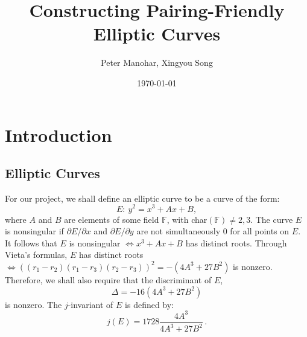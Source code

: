 \documentclass[12pt,twoside]{article}
\title{Constructing Pairing-Friendly Elliptic Curves }
\date{\today}
\author{ Peter Manohar, Xingyou Song}
\begin{document}
\maketitle


\tableofcontents

\section{Introduction}



\subsection{Elliptic Curves}

For our project, we shall define an elliptic curve to be a curve of the form:
\begin{equation}
E: \ y^2 = x^3 + Ax + B,
\end{equation}
where $A$ and $B$ are elements of some field $\mathbb F$, with char$(\mathbb F) \ne 2,3$. The curve $E$ is nonsingular if $\partial E / \partial x$ and $\partial E / \partial y$ are not simultaneously $0$ for all points on $E$. It follows that $E$ is nonsingular $\iff x^3+ Ax+ B$ has distinct roots. Through Vieta's formulas, $E$ has distinct roots $\iff ((r_{1} - r_{2})(r_{1} - r_{3})(r_{2} - r_{3}))^{2} = -(4A^{3} + 27B^{2})$ is nonzero. Therefore, we shall also require that the discriminant of $E$,
\begin{equation} 
\Delta = -16(4A^{3} + 27B^{2})
\end{equation}
is nonzero. 
The $j$-invariant of $E$ is defined by:
\begin{equation}
j(E) = 1728 \frac{4A^{3}}{4A^{3} + 27B^{2}} \, .
\end{equation}
\end{document}
